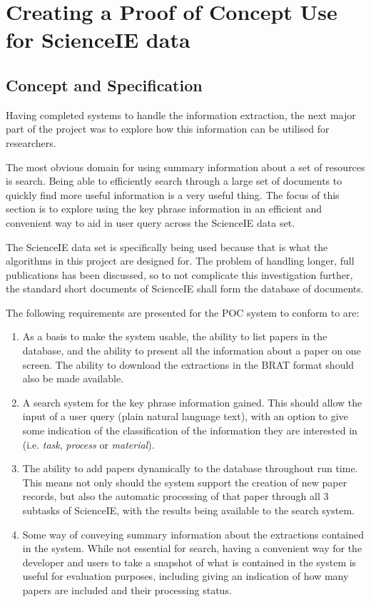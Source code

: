 \chapter{Creating a Proof of Concept Use for ScienceIE data}
\section{Concept and Specification}
Having completed systems to handle the information extraction, the next major part of the project was to explore how this information can be utilised for researchers. 

The most obvious domain for using summary information about a set of resources is search. Being able to efficiently search through a large set of documents to quickly find more useful information is a very useful thing. The focus of this section is to explore using the key phrase information in an efficient and convenient way to aid in user query across the ScienceIE data set. 

The ScienceIE data set is specifically being used because that is what the algorithms in this project are designed for. The problem of handling longer, full publications has been discussed, so to not complicate this investigation further, the standard short documents of ScienceIE shall form the database of documents.

The following requirements are presented for the POC system to conform to are:
\begin{enumerate}
	\item As a basis to make the system usable, the ability to list papers in the database, and the ability to present all the information about a paper on one screen. The ability to download the extractions in the BRAT format should also be made available. 
	\item A search system for the key phrase information gained. This should allow the input of a user query (plain natural language text), with an option to give some indication of the classification of the information they are interested in (i.e. \textit{task}, \textit{process} or \textit{material}).
	\item The ability to add papers dynamically to the database throughout run time. This means not only should the system support the creation of new paper records, but also the automatic processing of that paper through all 3 subtasks of ScienceIE, with the results being available to the search system.
	\item Some way of conveying summary information about the extractions contained in the system. While not essential for search, having a convenient way for the developer and users to take a snapshot of what is contained in the system is useful for evaluation purposes, including giving an indication of how many papers are included and their processing status.
\end{enumerate}

